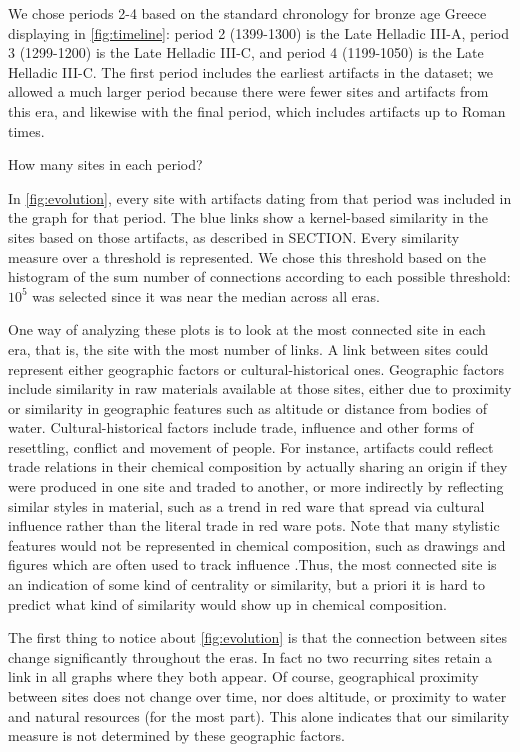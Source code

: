 We chose periods 2-4 based on the standard chronology for bronze age Greece displaying in \cref{fig:timeline}: period 2 (1399-1300) is the Late Helladic III-A, period 3 (1299-1200) is the Late Helladic III-C, and period 4 (1199-1050) is the Late Helladic III-C. The first period includes the earliest artifacts in the dataset; we allowed a much larger period because there were fewer sites and artifacts from this era, and likewise with the final period, which includes artifacts up to Roman times. 
  
  How many sites in each period?
  
In \cref{fig:evolution}, every site with artifacts dating from that period was included in the graph for that period. The blue links show a kernel-based similarity in the sites based on those artifacts, as described in SECTION. Every similarity measure over a threshold is represented. We chose this threshold based on the histogram of the sum number of connections according to each possible threshold: $10^{5}$ was selected since it was near the median across all eras.

One way of analyzing these plots is to look at the most connected site in each era, that is, the site with the most number of links. A link between sites could represent either geographic factors or cultural-historical ones. Geographic factors include similarity in raw materials available at those sites, either due to proximity or similarity in geographic features such as altitude or distance from bodies of water. Cultural-historical factors include trade, influence and other forms of resettling, conflict and movement of people. For instance, artifacts could reflect trade relations in their chemical composition by actually sharing an origin if they were produced in one site and traded to another, or more indirectly by reflecting similar styles in material, such as a trend in red ware that spread via cultural influence rather than the literal trade in red ware pots.  Note that many stylistic features would not be represented in chemical composition, such as drawings and figures which are often used to track influence \cite{hruby2010mycenaean}.Thus, the most connected site is an indication of some kind of centrality or similarity, but a priori it is hard to predict what kind of similarity would show up in chemical composition.

The first thing to notice about \cref{fig:evolution} is that the connection between sites change significantly throughout the eras. In fact no two recurring sites retain a link in all graphs where they both appear. Of course, geographical proximity between sites does not change over time, nor does altitude, or proximity to water and natural resources (for the most part). This alone indicates that our similarity measure is not determined by these geographic factors. 

